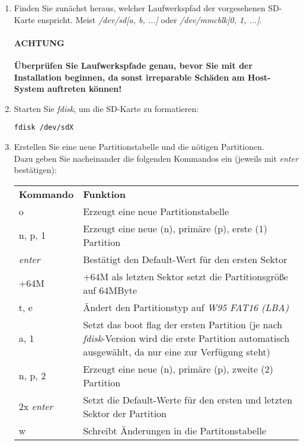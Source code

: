 \documentclass[manual.tex]{subfiles}
\begin{document}
\begin{enumerate}

\item Finden Sie zunächst heraus, welcher Laufwerkspfad der vorgesehenen SD-Karte enspricht. Meist \textit{/dev/sd[a, b, ...]} oder \textit{/dev/mmcblk[0, 1, ...]}.

{\paragraph{\color{red} ACHTUNG} \textbf{\color{red} Überprüfen Sie Laufwerkspfade genau, bevor Sie mit der Installation beginnen, da sonst irreparable Schäden am Host-System auftreten können!}}

\item Starten Sie \emph{fdisk}, um die SD-Karte zu formatieren:

\begin{lstlisting}
fdisk /dev/sdX
\end{lstlisting}

\item Erstellen Sie eine neue Partitionstabelle und die nötigen Partitionen.\\
Dazu geben Sie nacheinander die folgenden Kommandos ein (jeweils mit \textit{enter} bestätigen):

\begin{longtabu} to \textwidth {
	X[1]
    X[3]}
\textbf{Kommando} & \textbf{Funktion}\\
o & Erzeugt eine neue Partitionstabelle\\
n, p, 1 & Erzeugt eine neue (n), primäre (p), erste (1) Partition\\
\textit{enter} & Bestätigt den Default-Wert für den ersten Sektor\\
+64M & +64M als letzten Sektor setzt die Partitionsgröße auf 64MByte\\
t, e & Ändert den Partitionstyp auf \textit{W95 FAT16 (LBA)}\\
a, 1 & Setzt das boot flag der ersten Partition (je nach \emph{fdisk}-Version wird die erste Partition automatisch ausgewählt, da nur eine zur Verfügung steht)\\
n, p, 2 & Erzeugt eine neue (n), primäre (p), zweite (2) Partition\\
2x \textit{enter} & Setzt die Default-Werte für den ersten und letzten Sektor der Partition\\
w & Schreibt Änderungen in die Partitonstabelle
\end{longtabu}


\end{enumerate}
\end{document}
